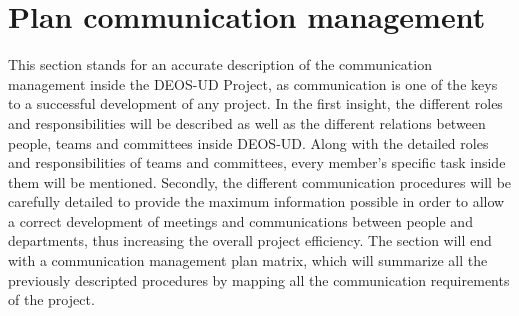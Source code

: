 \chapter{Plan communication management}
This section stands for an accurate description of the communication management inside the DEOS-UD Project, as communication is one of the keys to a successful development of any project. 
In the first insight, the different roles and responsibilities will be described as well as the different relations between people, teams and committees inside DEOS-UD. Along with the detailed roles and responsibilities of teams and committees, every member’s specific task inside them will be mentioned. 
Secondly, the different communication procedures will be carefully detailed to provide the maximum information possible in order to allow a correct development of meetings and communications between people and departments, thus increasing the overall project efficiency. 
The section will end with a communication management plan matrix, which will summarize all the previously descripted procedures by mapping all the communication requirements of the project. 



